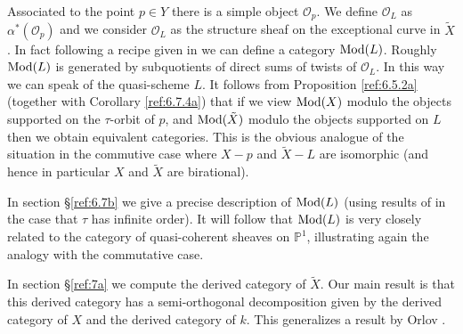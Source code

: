 \documentclass{amsproc}
\def \PP{{\mathbb P}}
\def\Oscr{{\mathcal O}}
\def\Mod{\mathop{\text{Mod}}}
\let\oldtext\text
\def\text#1{\oldtext{\upshape #1}}
\theoremstyle{definition}
\theoremstyle{remark}
\numberwithin{equation}{section}
\numberwithin{table}{section}
\numberwithin{figure}{section}
\begin{document}
Associated to the point $p\in Y$ there is a simple object $\Oscr_p$.
We define $\Oscr_L$ as $\alpha^\ast(\Oscr_p)$ and we consider
$\Oscr_L$ as the structure sheaf on the exceptional curve in $\tilde{X}$. In fact
following a recipe given in \cite{SmithZhang} we can define a
category $\Mod(L)$. Roughly $\Mod(L)$ is generated by subquotients of
direct sums of twists of $\Oscr_L$. In this way we can speak of the
quasi-scheme $L$. It follows from Proposition \ref{ref:6.5.2a}
(together with Corollary \ref{ref:6.7.4a}) that if we view $\Mod(X)$
modulo the objects supported on the $\tau$-orbit of $p$, and
$\Mod(\tilde{X})$ modulo the objects supported on $L$ then we obtain
equivalent categories. This is the obvious analogue of the situation in
the commutive case where $X-p$ and $\tilde{X}-L$ are isomorphic (and
hence in particular $X$ and $\tilde{X}$ are birational).


In section \S\ref{ref:6.7b} we give
a precise description of $\Mod(L)$ (using results of
\cite{SmithZhang} in the case that $\tau$ has infinite order). It
will follow that $\Mod(L)$ is very closely related to the category of
quasi-coherent sheaves on $\PP^1$, illustrating again the analogy with
the commutative case.

In section \S\ref{ref:7a} we compute the derived category of
$\tilde{X}$. Our main result is that this derived category has a
semi-orthogonal decomposition given by the derived category of $X$
and the derived category of $k$. This generalizes a result by Orlov
\cite{Orlov}.
\end{document}
